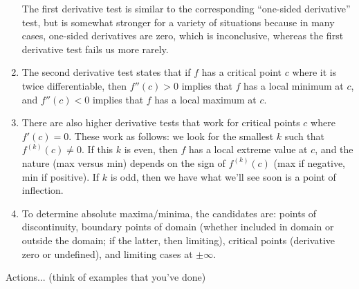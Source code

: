 \documentclass[10pt]{amsart}
\begin{document}
\begin{enumerate}
  The first derivative test is similar to the corresponding
  ``one-sided derivative'' test, but is somewhat stronger for a
  variety of situations because in many cases, one-sided derivatives
  are zero, which is inconclusive, whereas the first derivative test
  fails us more rarely.
\item The second derivative test states that if $f$ has a critical
  point $c$ where it is twice differentiable, then $f''(c) > 0$
  implies that $f$ has a local minimum at $c$, and $f''(c) < 0$
  implies that $f$ has a local maximum at $c$.
\item There are also higher derivative tests that work for critical
  points $c$ where $f'(c) = 0$. These work as follows: we look for the
  smallest $k$ such that $f^{(k)}(c) \ne 0$. If this $k$ is even, then
  $f$ has a local extreme value at $c$, and the nature (max versus
  min) depends on the sign of $f^{(k)}(c)$ (max if negative, min if
  positive). If $k$ is odd, then we have what we'll see soon is a
  point of inflection.
\item To determine absolute maxima/minima, the candidates are: points
  of discontinuity, boundary points of domain (whether included in
  domain or outside the domain; if the latter, then limiting),
  critical points (derivative zero or undefined), and limiting cases
  at $\pm \infty$.
\end{enumerate}

Actions... (think of examples that you've done)
\end{document}
